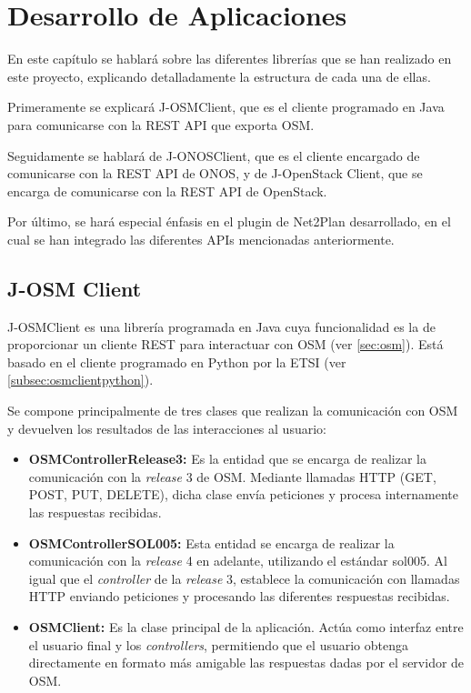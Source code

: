 \chapter{Desarrollo de Aplicaciones}

En este capítulo se hablará sobre las diferentes librerías que se han realizado en este proyecto, explicando detalladamente la estructura de cada una de ellas.

Primeramente se explicará J-OSMClient, que es el cliente programado en Java para comunicarse con la REST API que exporta OSM.

Seguidamente se hablará de J-ONOSClient, que es el cliente encargado de comunicarse con la REST API de ONOS, y de J-OpenStack Client, que se encarga de comunicarse con la REST API de OpenStack.

Por último, se hará especial énfasis en el plugin de Net2Plan desarrollado, en el cual se han integrado las diferentes APIs mencionadas anteriormente.


\section{J-OSM Client}
\label{sec:osmclient}

J-OSMClient\cite{josmclientbib} es una librería programada en Java cuya funcionalidad es la de proporcionar un cliente REST para interactuar con OSM (ver \ref{sec:osm}). Está basado en el cliente programado en Python por la ETSI (ver \ref{subsec:osmclientpython}).

Se compone principalmente de tres clases que realizan la comunicación con OSM y devuelven los resultados de las interacciones al usuario:

\begin{itemize}
	\item \textbf{OSMControllerRelease3:} Es la entidad que se encarga de realizar la comunicación con la \textit{release} 3 de OSM. Mediante llamadas HTTP (GET, POST, PUT, DELETE), dicha clase envía peticiones y procesa internamente las respuestas recibidas.
	
	\item \textbf{OSMControllerSOL005:} Esta entidad se encarga de realizar la comunicación con la \textit{release} 4 en adelante, utilizando el estándar sol005. Al igual que el \textit{controller} de la \textit{release} 3, establece la comunicación con llamadas HTTP enviando peticiones y procesando las diferentes respuestas recibidas.
	
	\item \textbf{OSMClient:} Es la clase principal de la aplicación. Actúa como interfaz entre el usuario final y los \textit{controllers}, permitiendo que el usuario obtenga directamente en formato más amigable las respuestas dadas por el servidor de OSM.
\end{itemize}

